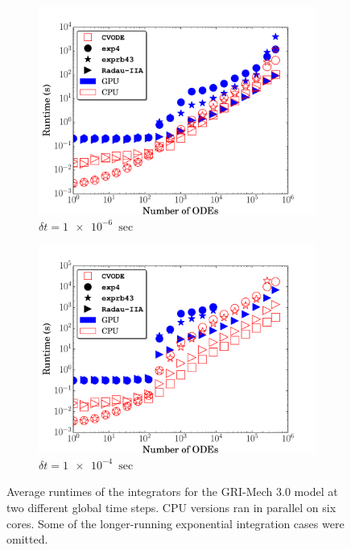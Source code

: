 \documentclass[preprint]{elsarticle}
\begin{document}
\begin{figure}[htb]
  \centering
  \begin{subfigure}{0.49\textwidth}
      \includegraphics[width=\linewidth]{GRI_1e-06_cpuvsgpu.pdf}
      \caption{$\delta t = \SI{1e-6}{\sec}$}
  \end{subfigure}
  \begin{subfigure}{0.49\textwidth}
      \includegraphics[width=\linewidth]{GRI_1e-04_cpuvsgpu.pdf}
      \caption{$\delta t = \SI{1e-4}{\sec}$}
  \end{subfigure}
  \caption{Average runtimes of the integrators for the GRI-Mech 3.0 model at two different global time steps. 
  CPU versions ran in parallel on six cores.
  Some of the longer-running exponential integration cases were omitted.}
  \label{F:GRI_perf}
\end{figure}
\end{document}
